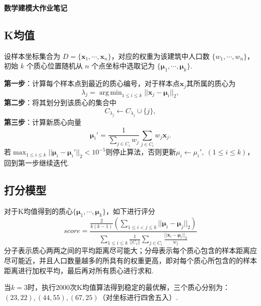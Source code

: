 \documentclass[12pt, a4paper, oneside]{ctexart}
\DeclareMathOperator*{\argmin}{arg\,min}  %
\let\leq=\leqslant %
\def\bd{\boldsymbol}        %
\def\disp{\displaystyle}    %
\begin{document}
\begin{center}
    \textbf{数学建模大作业笔记}
\end{center}\vspace{-0.2cm}

\subsection*{K均值}

设样本坐标集合为 $D = \{\bd{x}_1,\cdots,\bd{x}_n\}$，对应的权重为该建筑中人口数 $\{w_1,\cdots, w_n\}$，初始 $k$ 个质心位置随机从 $n$ 个点坐标中选取记为 $\{\bd{\mu}_1,\cdots,\bd{\mu}_k\}$.

\noindent\textbf{第一步}：计算每个样本点到最近的质心编号，对于样本点$\bd{x}_j$其所属的质心为
\begin{equation*}
    \lambda_j = \argmin_{1\leq i\leq k}||\bd{x}_j-\bd{\mu}_i||_2,
\end{equation*}
\textbf{第二步}：将其划分到该质心的集合中
\begin{equation*}
    C_{\lambda_j} \leftarrow C_{\lambda_j}\cup \{j\},
\end{equation*}
\textbf{第三步}：计算新质心向量
\begin{equation*}
    \bd{\mu}_i'= \frac{1}{\sum\limits_{j\in C_i}w_j}\sum_{j\in C_i}w_j\bd{x}_j.
\end{equation*}
若$\max_{1\leq i\leq k}||\bd{\mu}_i-\bd{\mu}_i'||_2 < 10^{-5}$则停止算法，否则更新$\mu_i\leftarrow \mu_i',\ (1\leq i\leq k)$，回到第一步继续迭代.

\subsection*{打分模型}

对于K均值得到的质心$\{\bd{\mu}_1,\cdots,\bd{\mu}_k\}$，如下进行评分
\begin{equation*}
    score = \frac{\disp\frac{2}{k(k-1)}\left(\sum_{1\leq i < j\leq k}||\bd{\mu}_i-\bd{\mu}_j||_2\right)}{\disp\sum_{1\leq i\leq k}\frac{1}{||C_i||}\sum_{j\in C_i}\frac{||\bd{x}_i-\bd{\mu}_i||_2}{w_j}}
\end{equation*}
分子表示质心两两之间的平均距离尽可能大；分母表示每个质心包含的样本距离应尽可能近，并且人口数量越多的所具有的权重更高，即对每个质心所包含的的样本距离进行加权平均，最后再对所有质心进行求和.

当$k=3$时，执行$2000$次K均值算法得到稳定的最优解，三个质心分别为：\\$(23,22), (44, 55), (67, 25)$（对坐标进行四舍五入）.
\end{document}
